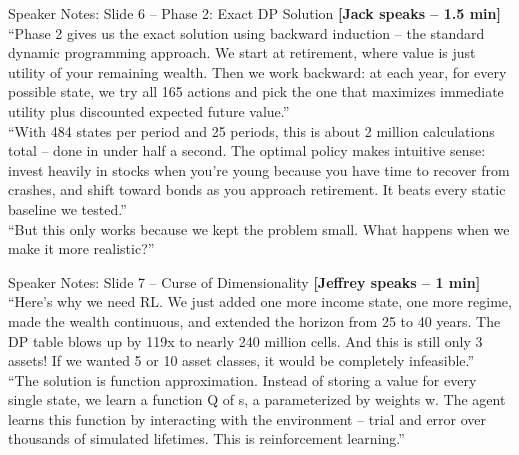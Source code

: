 \documentclass[aspectratio=169, 11pt]{beamer}
\begin{document}
\begin{frame}[allowframebreaks]{Speaker Notes: Slide 6 -- Phase 2: Exact DP Solution}
\textbf{[Jack speaks -- 1.5 min]}\\
``Phase 2 gives us the exact solution using backward induction -- the standard dynamic programming approach. We start at retirement, where value is just utility of your remaining wealth. Then we work backward: at each year, for every possible state, we try all 165 actions and pick the one that maximizes immediate utility plus discounted expected future value.''\\[0.5em]
``With 484 states per period and 25 periods, this is about 2 million calculations total -- done in under half a second. The optimal policy makes intuitive sense: invest heavily in stocks when you're young because you have time to recover from crashes, and shift toward bonds as you approach retirement. It beats every static baseline we tested.''\\[0.5em]
``But this only works because we kept the problem small. What happens when we make it more realistic?''
\end{frame}

\begin{frame}[allowframebreaks]{Speaker Notes: Slide 7 -- Curse of Dimensionality}
\textbf{[Jeffrey speaks -- 1 min]}\\
``Here's why we need RL. We just added one more income state, one more regime, made the wealth continuous, and extended the horizon from 25 to 40 years. The DP table blows up by 119x to nearly 240 million cells. And this is still only 3 assets! If we wanted 5 or 10 asset classes, it would be completely infeasible.''\\[0.5em]
``The solution is function approximation. Instead of storing a value for every single state, we learn a function Q of s, a parameterized by weights w. The agent learns this function by interacting with the environment -- trial and error over thousands of simulated lifetimes. This is reinforcement learning.''
\end{frame}
\end{document}
